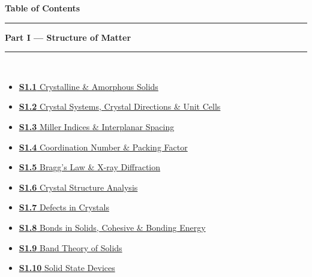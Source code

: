 \documentclass[12pt,a3paper]{article}
\begin{document}
\thispagestyle{fancy}
\begin{center}
  {\LARGE\bfseries\textcolor{pblue}{Table of Contents}}\\[6pt]
  \textcolor{pblue}{\rule{0.6\textwidth}{0.8pt}}
\end{center}
\vspace{6pt}

\begin{tcolorbox}[colback=cA!5,colframe=cA,boxrule=1pt,arc=5pt,
  left=8pt,right=8pt,top=8pt,bottom=8pt,before skip=4pt]
  {\large\bfseries\textcolor{cA}{Part I --- Structure of Matter}}\\[5pt]
  \textcolor{cA!40}{\rule{\textwidth}{0.4pt}}\\[3pt]
  \small\begin{itemize}[leftmargin=1.2em,itemsep=1pt,label={\textcolor{cA}{$\triangleright$}}]
    \item \hyperref[sec:s11]{\textbf{S1.1} Crystalline \& Amorphous Solids}
    \item \hyperref[sec:s12]{\textbf{S1.2} Crystal Systems, Crystal Directions \& Unit Cells}
    \item \hyperref[sec:s13]{\textbf{S1.3} Miller Indices \& Interplanar Spacing}
    \item \hyperref[sec:s14]{\textbf{S1.4} Coordination Number \& Packing Factor}
    \item \hyperref[sec:s15]{\textbf{S1.5} Bragg's Law \& X-ray Diffraction}
    \item \hyperref[sec:s16]{\textbf{S1.6} Crystal Structure Analysis}
    \item \hyperref[sec:s17]{\textbf{S1.7} Defects in Crystals}
    \item \hyperref[sec:s18]{\textbf{S1.8} Bonds in Solids, Cohesive \& Bonding Energy}
    \item \hyperref[sec:s19]{\textbf{S1.9} Band Theory of Solids}
    \item \hyperref[sec:s110]{\textbf{S1.10} Solid State Devices}
  \end{itemize}
\end{tcolorbox}
\end{document}
